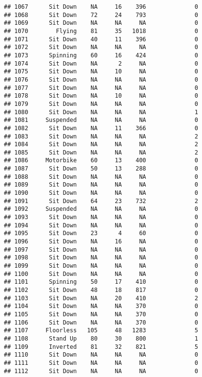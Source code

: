 \documentclass[
]{article}
\begin{document}
\begin{verbatim}
## 1067      Sit Down    NA     16    396              0
## 1068      Sit Down    72     24    793              0
## 1069      Sit Down    NA     NA     NA              0
## 1070        Flying    81     35   1018              0
## 1071      Sit Down    40     11    396              0
## 1072      Sit Down    NA     NA     NA              0
## 1073      Spinning    60     16    424              0
## 1074      Sit Down    NA      2     NA              0
## 1075      Sit Down    NA     10     NA              0
## 1076      Sit Down    NA     NA     NA              0
## 1077      Sit Down    NA     NA     NA              0
## 1078      Sit Down    NA     10     NA              0
## 1079      Sit Down    NA     NA     NA              0
## 1080      Sit Down    NA     NA     NA              1
## 1081     Suspended    NA     NA     NA              0
## 1082      Sit Down    NA     11    366              0
## 1083      Sit Down    NA     NA     NA              2
## 1084      Sit Down    NA     NA     NA              2
## 1085      Sit Down    NA     NA     NA              2
## 1086     Motorbike    60     13    400              0
## 1087      Sit Down    50     13    288              0
## 1088      Sit Down    NA     NA     NA              0
## 1089      Sit Down    NA     NA     NA              0
## 1090      Sit Down    NA     NA     NA              0
## 1091      Sit Down    64     23    732              2
## 1092     Suspended    NA     NA     NA              0
## 1093      Sit Down    NA     NA     NA              0
## 1094      Sit Down    NA     NA     NA              0
## 1095      Sit Down    23      4     60              0
## 1096      Sit Down    NA     16     NA              0
## 1097      Sit Down    NA     NA     NA              0
## 1098      Sit Down    NA     NA     NA              0
## 1099      Sit Down    NA     NA     NA              0
## 1100      Sit Down    NA     NA     NA              0
## 1101      Spinning    50     17    410              0
## 1102      Sit Down    48     18    817              0
## 1103      Sit Down    NA     20    410              2
## 1104      Sit Down    NA     NA    370              0
## 1105      Sit Down    NA     NA    370              0
## 1106      Sit Down    NA     NA    370              0
## 1107     Floorless   105     48   1283              5
## 1108      Stand Up    80     30    800              1
## 1109      Inverted    81     32    821              5
## 1110      Sit Down    NA     NA     NA              0
## 1111      Sit Down    NA     NA     NA              0
## 1112      Sit Down    NA     NA     NA              0

\end{verbatim}
\end{document}
